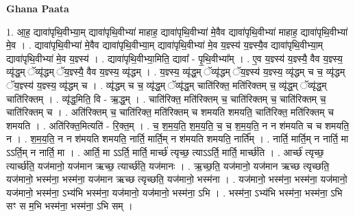 \documentclass[17pt]{extarticle}
\begin{document}
\textbf{Ghana Paata } \newline

1. आ॒ह॒ द्यावा॑पृथि॒वीभ्या॒म् द्यावा॑पृथि॒वीभ्या॑ माहाह॒ द्यावा॑पृथि॒वीभ्या॑ मे॒वैव द्यावा॑पृथि॒वीभ्या॑ 
माहाह॒ द्यावा॑पृथि॒वीभ्या॑ मे॒व । . द्यावा॑पृथि॒वीभ्या॑ मे॒वैव द्यावा॑पृथि॒वीभ्या॒म् द्यावा॑पृथि॒वीभ्या॑ मे॒व य॒ज्ञ्स्य॑ य॒ज्ञ्स्यै॒व द्यावा॑पृथि॒वीभ्या॒म् द्यावा॑पृथि॒वीभ्या॑ मे॒व य॒ज्ञ्स्य॑ । . द्यावा॑पृथि॒वीभ्या॒मिति॒ द्यावा᳚ - पृ॒थि॒वीभ्या᳚म् । . ए॒व य॒ज्ञ्स्य॑ य॒ज्ञ्स्यै॒ वैव य॒ज्ञ्स्य॒ व्यृ॑द्ध॒म् ॅव्यृ॑द्धम् ॅय॒ज्ञ्स्यै॒ वैव य॒ज्ञ्स्य॒ व्यृ॑द्धम् । . य॒ज्ञ्स्य॒ व्यृ॑द्ध॒म् ॅव्यृ॑द्धम् ॅय॒ज्ञ्स्य॑ य॒ज्ञ्स्य॒ व्यृ॑द्धम् च च॒ व्यृ॑द्धम् ॅय॒ज्ञ्स्य॑ य॒ज्ञ्स्य॒ व्यृ॑द्धम् च । . व्यृ॑द्धम् च च॒ व्यृ॑द्ध॒म् ॅव्यृ॑द्ध॒म् चाति॑रिक्त॒ मति॑रिक्तम् च॒ व्यृ॑द्ध॒म् ॅव्यृ॑द्ध॒म् चाति॑रिक्तम् । . व्यृ॑द्ध॒मिति॒ वि - ऋ॒द्ध॒म् । . चाति॑रिक्त॒ मति॑रिक्तम् च॒ चाति॑रिक्तम् च॒ चाति॑रिक्तम् च॒ चाति॑रिक्तम् च । . अति॑रिक्तम् च॒ चाति॑रिक्त॒ मति॑रिक्तम् च शमयति शमयति॒ चाति॑रिक्त॒ मति॑रिक्तम् च शमयति । . अति॑रिक्त॒मित्यति॑ - रि॒क्त॒म् । . च॒ श॒म॒य॒ति॒ श॒म॒य॒ति॒ च॒ च॒ श॒म॒य॒ति॒ न न श॑मयति च च शमयति॒ न । . श॒म॒य॒ति॒ न न श॑मयति शमयति॒ नार्ति॒ मार्ति॒म् न श॑मयति शमयति॒ नार्ति᳚म् । . नार्ति॒ मार्ति॒म् न नार्ति॒ मा ऽऽर्ति॒म् न नार्ति॒ मा । . आर्ति॒ मा ऽऽर्ति॒ मार्ति॒ मार्च्छ॑ त्यृच्छ॒ त्याऽऽर्ति॒ मार्ति॒ मार्च्छ॑ति । . आर्च्छ॑ त्यृच्छ॒ त्यार्च्छ॑ति॒ यज॑मानो॒ यज॑मान ऋच्छ॒ त्यार्च्छ॑ति॒ यज॑मानः । . ऋ॒च्छ॒ति॒ यज॑मानो॒ यज॑मान ऋच्छ त्यृच्छति॒ यज॑मानो॒ भस्म॑ना॒ भस्म॑ना॒ यज॑मान ऋच्छ त्यृच्छति॒ यज॑मानो॒ भस्म॑ना । . यज॑मानो॒ भस्म॑ना॒ भस्म॑ना॒ यज॑मानो॒ यज॑मानो॒ भस्म॑ना॒ ऽभ्य॑भि भस्म॑ना॒ यज॑मानो॒ यज॑मानो॒ भस्म॑ना॒ ऽभि । . भस्म॑ना॒ ऽभ्य॑भि भस्म॑ना॒ भस्म॑ना॒ ऽभि सꣳ स म॒भि भस्म॑ना॒ भस्म॑ना॒ ऽभि सम् । \newline
\end{document}
